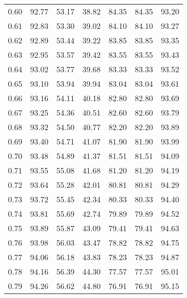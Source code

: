 \begin{tabular}{|c|c|c|c|c|c|c|}
      0.60 &     92.77 &     53.17 &      38.82 &   84.35 &      84.35 &         93.20 \\
      0.61 &     92.83 &     53.30 &      39.02 &   84.10 &      84.10 &         93.27 \\
      0.62 &     92.89 &     53.44 &      39.22 &   83.85 &      83.85 &         93.35 \\
      0.63 &     92.95 &     53.57 &      39.42 &   83.55 &      83.55 &         93.43 \\
      0.64 &     93.02 &     53.77 &      39.68 &   83.33 &      83.33 &         93.52 \\
      0.65 &     93.10 &     53.94 &      39.94 &   83.04 &      83.04 &         93.61 \\
      0.66 &     93.16 &     54.11 &      40.18 &   82.80 &      82.80 &         93.69 \\
      0.67 &     93.25 &     54.36 &      40.51 &   82.60 &      82.60 &         93.79 \\
      0.68 &     93.32 &     54.50 &      40.77 &   82.20 &      82.20 &         93.89 \\
      0.69 &     93.40 &     54.71 &      41.07 &   81.90 &      81.90 &         93.99 \\
      0.70 &     93.48 &     54.89 &      41.37 &   81.51 &      81.51 &         94.09 \\
      0.71 &     93.55 &     55.08 &      41.68 &   81.20 &      81.20 &         94.19 \\
      0.72 &     93.64 &     55.28 &      42.01 &   80.81 &      80.81 &         94.29 \\
      0.73 &     93.72 &     55.45 &      42.34 &   80.33 &      80.33 &         94.40 \\
      0.74 &     93.81 &     55.69 &      42.74 &   79.89 &      79.89 &         94.52 \\
      0.75 &     93.89 &     55.87 &      43.09 &   79.41 &      79.41 &         94.63 \\
      0.76 &     93.98 &     56.03 &      43.47 &   78.82 &      78.82 &         94.75 \\
      0.77 &     94.06 &     56.18 &      43.83 &   78.23 &      78.23 &         94.87 \\
      0.78 &     94.16 &     56.39 &      44.30 &   77.57 &      77.57 &         95.01 \\
      0.79 &     94.26 &     56.62 &      44.80 &   76.91 &      76.91 &         95.15 \\

\end{tabular}
